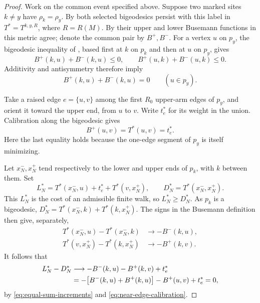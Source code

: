 \begin{proof}
Work on the common event specified above.  Suppose two marked sites
$k\ne y$ have $\rho_k=\rho_y$.  By  both selected
bigeodesics persist with this label in $T^*=T^{k,y,R}$, where $R=R(M)$.
By  their upper and lower Busemann functions in
this metric agree; denote the common pair by $B^+,B^-$.  For a vertex
$u$ on $p_y$, the bigeodesic inequality of , based
first at $k$ on $p_k$ and then at $u$ on $p_y$, gives
\[
 B^+(k,u)+B^-(k,u)\leq0,\qquad
 B^+(u,k)+B^-(u,k)\leq0.
\]
Additivity and antisymmetry therefore imply
\begin{equation}\label{eq:equal-sum-increments}
 B^+(k,u)+B^-(k,u)=0\qquad(u\in p_y).
\end{equation}

Take a raised edge $e=\{u,v\}$ among the first $R_0$ upper-arm edges of
$p_y$, and orient it toward the upper end, from $u$ to $v$.  Write $t_e^*$
for its weight in the union.  Calibration along the bigeodesic gives
\begin{equation}\label{eq:near-edge-calibration}
 B^+(u,v)=T^*(u,v)=t_e^*.
\end{equation}
Here the last equality holds because the one-edge segment of $p_y$
is itself minimizing.

Let $x_N^-,x_N^+$ tend respectively to the lower and upper ends of
$p_k$, with $k$ between them.  Set
\[
 L_N^*=T^*(x_N^-,u)+t_e^*+T^*(v,x_N^+),\qquad
 D_N^*=T^*(x_N^-,x_N^+).
\]
This $L_N^*$ is the cost of an admissible finite walk, so
$L_N^*\geq D_N^*$.  As $p_k$ is a bigeodesic,
$D_N^*=T^*(x_N^-,k)+T^*(k,x_N^+)$.  The signs in the Busemann definition
then give, separately,
\begin{align*}
 T^*(x_N^-,u)-T^*(x_N^-,k)&\longrightarrow-B^-(k,u),\\
 T^*(v,x_N^+)-T^*(k,x_N^+)&\longrightarrow-B^+(k,v).
\end{align*}
It follows that
\begin{align}
 L_N^*-D_N^*
 &\longrightarrow -B^-(k,u)-B^+(k,v)+t_e^*\notag\\
 &=-\bigl[B^-(k,u)+B^+(k,u)\bigr]-B^+(u,v)+t_e^*=0,
 \label{eq:detour-excess}
\end{align}
by \eqref{eq:equal-sum-increments} and \eqref{eq:near-edge-calibration}.


\end{proof}
